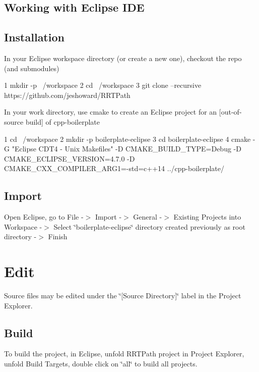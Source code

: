 \subsection*{Working with Eclipse I\+DE}

\subsection*{Installation}

In your Eclipse workspace directory (or create a new one), checkout the repo (and submodules) 
\begin{DoxyCode}
1 mkdir -p ~/workspace
2 cd ~/workspace
3 git clone --recursive https://github.com/jeshoward/RRTPath
\end{DoxyCode}


In your work directory, use cmake to create an Eclipse project for an \mbox{[}out-\/of-\/source build\mbox{]} of cpp-\/boilerplate


\begin{DoxyCode}
1 cd ~/workspace
2 mkdir -p boilerplate-eclipse
3 cd boilerplate-eclipse
4 cmake -G "Eclipse CDT4 - Unix Makefiles" -D CMAKE\_BUILD\_TYPE=Debug -D CMAKE\_ECLIPSE\_VERSION=4.7.0 -D
       CMAKE\_CXX\_COMPILER\_ARG1=-std=c++14 ../cpp-boilerplate/
\end{DoxyCode}


\subsection*{Import}

Open Eclipse, go to File -\/$>$ Import -\/$>$ General -\/$>$ Existing Projects into Workspace -\/$>$ Select \char`\"{}boilerplate-\/eclipse\char`\"{} directory created previously as root directory -\/$>$ Finish

\section*{Edit}

Source files may be edited under the \char`\"{}\mbox{[}\+Source Directory\mbox{]}\char`\"{} label in the Project Explorer.

\subsection*{Build}

To build the project, in Eclipse, unfold R\+R\+T\+Path project in Project Explorer, unfold Build Targets, double click on \char`\"{}all\char`\"{} to build all projects.

